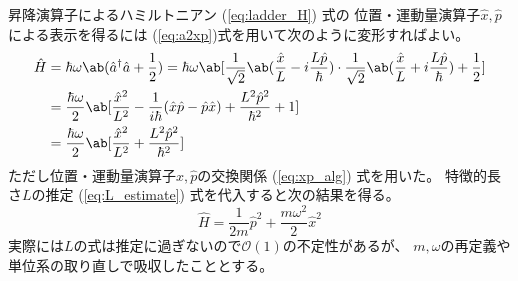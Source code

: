 昇降演算子によるハミルトニアン (\ref{eq:ladder_H}) 式の
位置・運動量演算子$\hat{x},\hat{p}$による表示を得るには
(\ref{eq:a2xp})式を用いて次のように変形すればよい。
\begin{equation}
  \begin{split}
    \hat{H}
    &=\hbar\omega\ab(\hat{a}^\dagger\hat{a}+\frac{1}{2})
    =\hbar\omega\ab[
      \frac{1}{\sqrt{2}}
      \ab(\frac{\hat{x}}{L}-i\frac{L\hat{p}}{\hbar})
      \cdot
      \frac{1}{\sqrt{2}}
      \ab(\frac{\hat{x}}{L}+i\frac{L\hat{p}}{\hbar})
      +\frac{1}{2}
    ] \\
    &=\frac{\hbar\omega}{2}\ab[
      \frac{\hat{x}^2}{L^2}
      -\frac{1}{i\hbar}(\hat{x}\hat{p}-\hat{p}\hat{x})
      +\frac{L^2\hat{p}^2}{\hbar^2}
      +1
    ] \\
    &=\frac{\hbar\omega}{2}\ab[
      \frac{\hat{x}^2}{L^2}
      +\frac{L^2\hat{p}^2}{\hbar^2}
    ]
  \end{split}
\end{equation}
ただし位置・運動量演算子$\hat{x},\hat{p}$の交換関係 (\ref{eq:xp_alg}) 式を用いた。
特徴的長さ$L$の推定 (\ref{eq:L_estimate}) 式を代入すると次の結果を得る。
\begin{equation}
  \label{eq:H_xp}
  \hat{H}=\frac{1}{2m}\hat{p}^2+\frac{m\omega^2}{2}\hat{x}^2
  \tag{9.4}
\end{equation}
実際には$L$の式は推定に過ぎないので$\mathcal{O}(1)$の不定性があるが、
$m,\omega$の再定義や単位系の取り直しで吸収したこととする。


